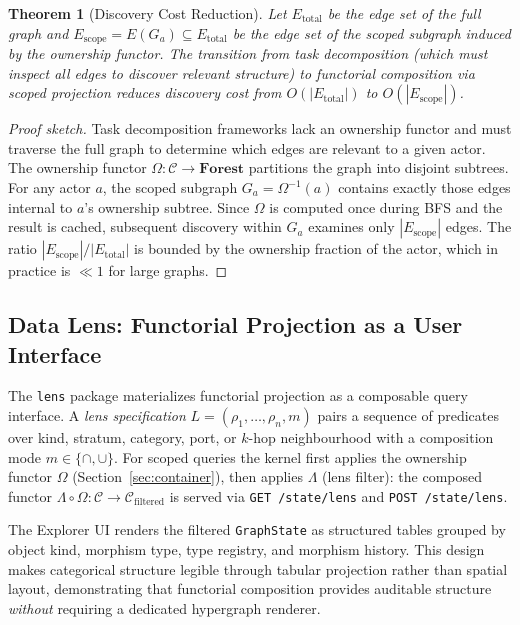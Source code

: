 \documentclass[submission,copyright,creativecommons]{eptcs}
\newtheorem{theorem}{Theorem}
\begin{document}
\begin{theorem}[Discovery Cost Reduction]
\label{thm:discovery-cost}
Let $E_{\mathrm{total}}$ be the edge set of the full graph and
$E_{\mathrm{scope}} = E(G_a) \subseteq E_{\mathrm{total}}$ be the edge set
of the scoped subgraph induced by the ownership functor. The transition from
task decomposition (which must inspect all edges to discover relevant
structure) to functorial composition via scoped projection reduces discovery
cost from $O(|E_{\mathrm{total}}|)$ to $O(|E_{\mathrm{scope}}|)$.
\end{theorem}

\begin{proof}[Proof sketch]
Task decomposition frameworks lack an ownership functor and must traverse the
full graph to determine which edges are relevant to a given actor. The
ownership functor $\Omega\colon \mathcal{C} \to \mathbf{Forest}$ partitions
the graph into disjoint subtrees. For any actor $a$, the scoped subgraph
$G_a = \Omega^{-1}(a)$ contains exactly those edges internal to $a$'s
ownership subtree. Since $\Omega$ is computed once during BFS and the result
is cached, subsequent discovery within $G_a$ examines only
$|E_{\mathrm{scope}}|$ edges. The ratio
$|E_{\mathrm{scope}}|/|E_{\mathrm{total}}|$ is bounded by the ownership
fraction of the actor, which in practice is $\ll 1$ for large graphs.
\end{proof}

\subsection{Data Lens: Functorial Projection as a User Interface}
\label{subsec:data-lens}

The \texttt{lens} package materializes functorial projection as a composable
query interface. A \emph{lens specification} $L = (\rho_1, \ldots, \rho_n, m)$
pairs a sequence of predicates over kind, stratum, category, port, or
$k$-hop neighbourhood with a composition mode $m \in \{\cap, \cup\}$.
For scoped queries the kernel first applies the ownership functor
$\Omega$ (Section~\ref{sec:container}), then applies $\Lambda$ (lens filter):
the composed functor $\Lambda \circ \Omega \colon \mathcal{C} \to
\mathcal{C}_{\mathrm{filtered}}$ is served via \texttt{GET /state/lens} and
\texttt{POST /state/lens}.

The Explorer UI renders the filtered \texttt{GraphState} as structured tables
grouped by object kind, morphism type, type registry, and morphism history.
This design makes categorical structure legible through tabular projection
rather than spatial layout, demonstrating that functorial composition provides
auditable structure \emph{without} requiring a dedicated hypergraph renderer.
\end{document}
